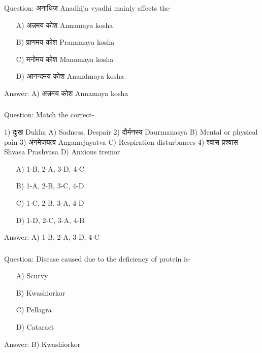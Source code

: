 \begin{frame}[fragile]\frametitle{}

Question: अनाधिज Anadhija vyadhi mainly affects the-

\begin{itemize}
\item[A)] अन्नमय कोश Annamaya kosha
\item[B)] प्राणमय कोश Pranamaya kosha
\item[C)] मनोमय कोश Manomaya kosha
\item[D)] आनन्दमय कोश Anandmaya kosha
\end{itemize}

Answer: A) अन्नमय कोश Annamaya kosha
\end{frame}

\begin{frame}[fragile]\frametitle{}

Question: Match the correct-

1) दुःख Dukha                            A) Sadness, Despair
2) दौर्मनस्य Daurmanasya                    B) Mental or physical pain
3) अंगमेजयत्व Angamejayatva                  C) Respiration disturbances
4) श्वास प्रश्वास Shvasa Prashvasa              D) Anxious tremor

\begin{itemize}
\item[A)] 1-B, 2-A, 3-D, 4-C
\item[B)] 1-A, 2-B, 3-C, 4-D
\item[C)] 1-C, 2-B, 3-A, 4-D
\item[D)] 1-D, 2-C, 3-A, 4-B
\end{itemize}

Answer: A) 1-B, 2-A, 3-D, 4-C
\end{frame}

\begin{frame}[fragile]\frametitle{}

Question: Disease caused due to the deficiency of protein is-

\begin{itemize}
\item[A)] Scurvy
\item[B)] Kwashiorkor
\item[C)] Pellagra
\item[D)] Cataract
\end{itemize}

Answer: B) Kwashiorkor
\end{frame}

